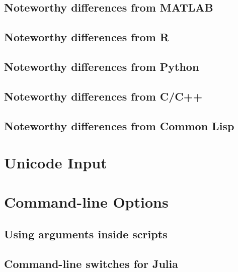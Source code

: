     \section{Noteworthy differences from MATLAB}
    \section{Noteworthy differences from R}
    \section{Noteworthy differences from Python}
    \section{Noteworthy differences from C/C++}
    \section{Noteworthy differences from Common Lisp}
  \chapter{Unicode Input}
  \chapter{Command-line Options}
    \section{Using arguments inside scripts}
    \section{Command-line switches for Julia}
